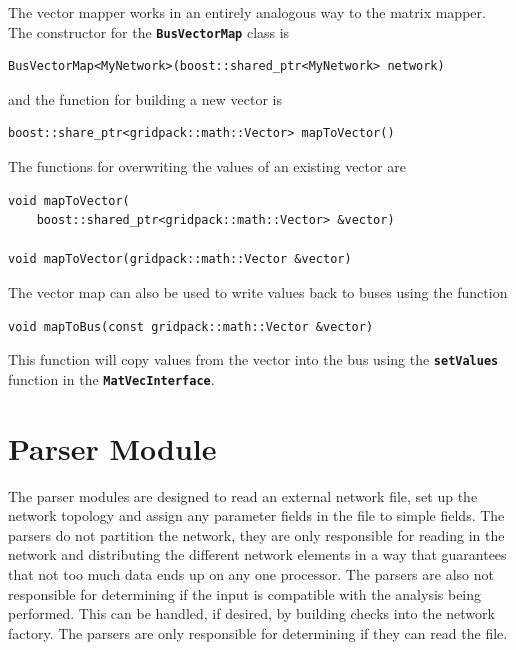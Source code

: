 \documentclass[12pt]{report} %
\begin{document}
The vector mapper works in an entirely analogous way to the matrix mapper. The constructor for the \texttt{\textbf{BusVectorMap}} class is

{
\color{red}
\begin{Verbatim}[fontseries=b]
BusVectorMap<MyNetwork>(boost::shared_ptr<MyNetwork> network)
\end{Verbatim}
}

and the function for building a new vector is

{
\color{red}
\begin{Verbatim}[fontseries=b]
boost::share_ptr<gridpack::math::Vector> mapToVector()
\end{Verbatim}
}

The functions for overwriting the values of an existing vector are

{
\color{red}
\begin{Verbatim}[fontseries=b]
void mapToVector(
    boost::shared_ptr<gridpack::math::Vector> &vector)

void mapToVector(gridpack::math::Vector &vector)
\end{Verbatim}
}

The vector map can also be used to write values back to buses using the function

{
\color{red}
\begin{Verbatim}[fontseries=b]
void mapToBus(const gridpack::math::Vector &vector)
\end{Verbatim}
}

This function will copy values from the vector into the bus using the \texttt{\textbf{setValues}} function in the \texttt{\textbf{MatVecInterface}}.

\section{Parser Module}

The parser modules are designed to read an external network file, set up the network topology and assign any parameter fields in the file to simple fields. The parsers do not partition the network, they are only responsible for reading in the network and distributing the different network elements in a way that guarantees that not too much data ends up on any one processor. The parsers are also not responsible for determining if the input is compatible with the analysis being performed. This can be handled, if desired, by building checks into the network factory. The parsers are only responsible for determining if they can read the file.
\end{document}
